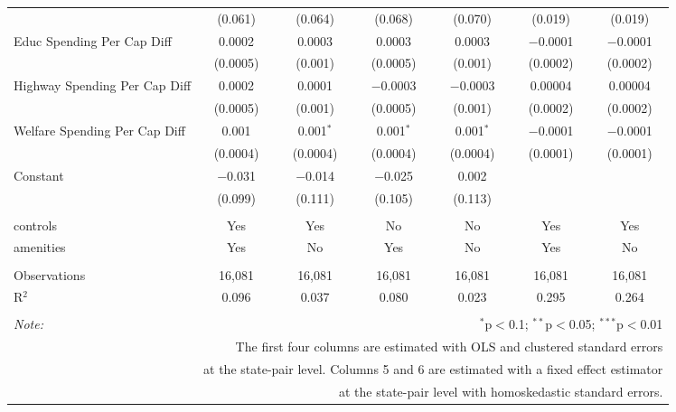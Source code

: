 \begin{table}[!htbp]
\begin{tabular}{@{\extracolsep{5pt}}lcccccc}
  & (0.061) & (0.064) & (0.068) & (0.070) & (0.019) & (0.019) \\ 
  Educ Spending Per Cap Diff & 0.0002 & 0.0003 & 0.0003 & 0.0003 & $-$0.0001 & $-$0.0001 \\ 
  & (0.0005) & (0.001) & (0.0005) & (0.001) & (0.0002) & (0.0002) \\ 
  Highway Spending Per Cap Diff & 0.0002 & 0.0001 & $-$0.0003 & $-$0.0003 & 0.00004 & 0.00004 \\ 
  & (0.0005) & (0.001) & (0.0005) & (0.001) & (0.0002) & (0.0002) \\ 
  Welfare Spending Per Cap Diff & 0.001 & 0.001$^{*}$ & 0.001$^{*}$ & 0.001$^{*}$ & $-$0.0001 & $-$0.0001 \\ 
  & (0.0004) & (0.0004) & (0.0004) & (0.0004) & (0.0001) & (0.0001) \\ 
  Constant & $-$0.031 & $-$0.014 & $-$0.025 & 0.002 &  &  \\ 
  & (0.099) & (0.111) & (0.105) & (0.113) &  &  \\ 
 \hline \\[-1.8ex] 
controls & Yes & Yes & No & No & Yes & Yes \\ 
amenities & Yes & No & Yes & No & Yes & No \\ 
\hline \\[-1.8ex] 
Observations & 16,081 & 16,081 & 16,081 & 16,081 & 16,081 & 16,081 \\ 
R$^{2}$ & 0.096 & 0.037 & 0.080 & 0.023 & 0.295 & 0.264 \\ 
\hline 
\hline \\[-1.8ex] 
\textit{Note:}  & \multicolumn{6}{r}{$^{*}$p$<$0.1; $^{**}$p$<$0.05; $^{***}$p$<$0.01} \\ 
 & \multicolumn{6}{r}{The first four columns are estimated with OLS and clustered standard errors} \\ 
 & \multicolumn{6}{r}{at the state-pair level. Columns 5 and 6 are estimated with a fixed effect estimator} \\ 
 & \multicolumn{6}{r}{at the state-pair level with homoskedastic standard errors.} \\ 
\end{tabular} 
\end{table} 
